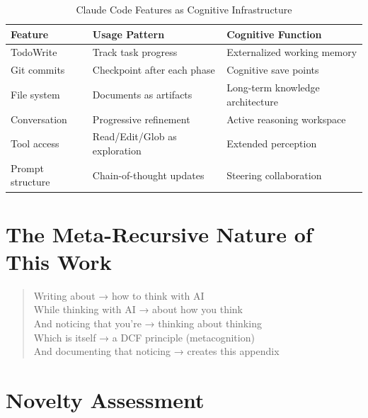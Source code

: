 \begin{table}[H]
\centering
\small
\begin{tabular}{lll}
\toprule
\textbf{Feature} & \textbf{Usage Pattern} & \textbf{Cognitive Function} \\
\midrule
TodoWrite & Track task progress & Externalized working memory \\
Git commits & Checkpoint after each phase & Cognitive save points \\
File system & Documents as artifacts & Long-term knowledge architecture \\
Conversation & Progressive refinement & Active reasoning workspace \\
Tool access & Read/Edit/Glob as exploration & Extended perception \\
Prompt structure & Chain-of-thought updates & Steering collaboration \\
\bottomrule
\end{tabular}
\caption{Claude Code Features as Cognitive Infrastructure}
\end{table}

\section{The Meta-Recursive Nature of This Work}

\begin{quote}
Writing about → how to think with AI \\
While thinking with AI → about how you think \\
And noticing that you're → thinking about thinking \\
Which is itself → a DCF principle (metacognition) \\
And documenting that noticing → creates this appendix
\end{quote}

\section{Novelty Assessment}

